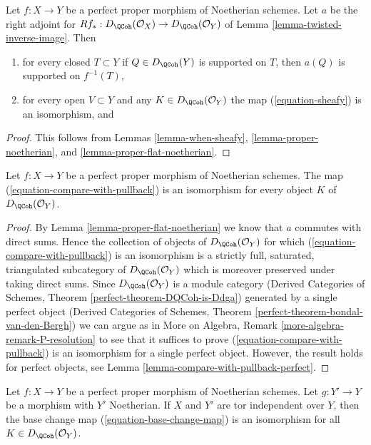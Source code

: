 \begin{lemma}
\label{lemma-proper-flat-noetherian-relative}
Let $f : X \to Y$ be a perfect proper morphism of Noetherian schemes.
Let $a$ be the right adjoint for
$Rf_* : D_\QCoh(\mathcal{O}_X) \to D_\QCoh(\mathcal{O}_Y)$ of
Lemma \ref{lemma-twisted-inverse-image}. Then
\begin{enumerate}
\item for every closed $T \subset Y$ if $Q \in D_\QCoh(Y)$ is supported on $T$,
then $a(Q)$ is supported on $f^{-1}(T)$,
\item for every open $V \subset Y$ and any $K \in D_\QCoh(\mathcal{O}_Y)$
the map (\ref{equation-sheafy}) is an isomorphism, and
\end{enumerate}
\end{lemma}

\begin{proof}
This follows from Lemmas \ref{lemma-when-sheafy},
\ref{lemma-proper-noetherian}, and
\ref{lemma-proper-flat-noetherian}.
\end{proof}

\begin{lemma}
\label{lemma-compare-with-pullback-flat-proper-noetherian}
Let $f : X \to Y$ be a perfect proper morphism of Noetherian
schemes. The map (\ref{equation-compare-with-pullback}) is an isomorphism
for every object $K$ of $D_\QCoh(\mathcal{O}_Y)$.
\end{lemma}

\begin{proof}
By Lemma \ref{lemma-proper-flat-noetherian} we know that $a$ commutes
with direct sums. Hence the collection of objects of
$D_\QCoh(\mathcal{O}_Y)$ for which (\ref{equation-compare-with-pullback})
is an isomorphism is a strictly full, saturated, triangulated
subcategory of $D_\QCoh(\mathcal{O}_Y)$ which is moreover
preserved under taking direct sums. Since $D_\QCoh(\mathcal{O}_Y)$
is a module category (Derived Categories of Schemes, Theorem
\ref{perfect-theorem-DQCoh-is-Ddga}) generated by a single
perfect object (Derived Categories of Schemes, Theorem
\ref{perfect-theorem-bondal-van-den-Bergh})
we can argue as in
More on Algebra, Remark \ref{more-algebra-remark-P-resolution}
to see that it suffices to prove (\ref{equation-compare-with-pullback})
is an isomorphism for a single perfect object.
However, the result holds for perfect objects, see
Lemma \ref{lemma-compare-with-pullback-perfect}.
\end{proof}

\begin{lemma}
\label{lemma-proper-perfect-base-change}
Let $f : X \to Y$ be a perfect proper morphism of Noetherian schemes.
Let $g : Y' \to Y$ be a morphism with $Y'$ Noetherian. If $X$ and
$Y'$ are tor independent over $Y$, then the base
change map (\ref{equation-base-change-map}) is an isomorphism
for all $K \in D_\QCoh(\mathcal{O}_Y)$.
\end{lemma}

